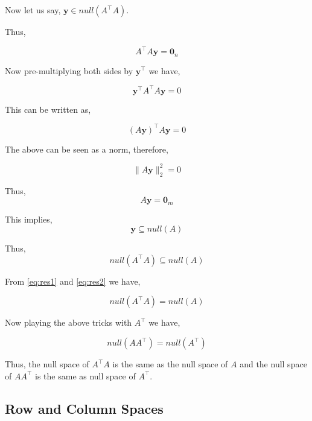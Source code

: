 \documentclass[a4paper]{article}
\begin{document}
Now let us say, $\boldsymbol{y} \in null(A^{\top}A)$.

Thus,

\begin{equation}
A^{\top}A \boldsymbol{y} = \boldsymbol{0}_n 
\end{equation}

Now pre-multiplying both sides by $\boldsymbol{y}^{\top}$ we have,

\begin{equation}
\boldsymbol{y}^{\top}A^{\top}A \boldsymbol{y} = 0
\end{equation}

This can be written as,

\begin{equation}
\left(A\boldsymbol{y}\right)^{\top}A \boldsymbol{y} = 0
\end{equation}

The above can be seen as a norm, therefore,

\begin{equation}
\| A \boldsymbol{y} \|_{2}^{2} = 0
\end{equation}

Thus, \begin{equation}
A \boldsymbol{y} = \boldsymbol{0}_m
\end{equation}

This implies, \begin{equation}
\boldsymbol{y} \subseteq null(A)
\end{equation}

Thus, 
\begin{equation}
null(A^{\top}A) \subseteq null(A)
\label{eq:res2}
\end{equation}

From \ref{eq:res1} and \ref{eq:res2} we have,

\begin{equation}
null(A^{\top}A) = null(A)
\end{equation}

Now playing the above tricks with $A^{\top}$ we have,

\begin{equation}
null(AA^{\top}) = null(A^{\top})
\label{eq:AAt}
\end{equation}

Thus, the null space of $A^{\top}A$ is the same as the null space of $A$ and the null space of $AA^{\top}$ is the same as null space of $A^{\top}$.

\subsection{Row and Column Spaces}
\end{document}
